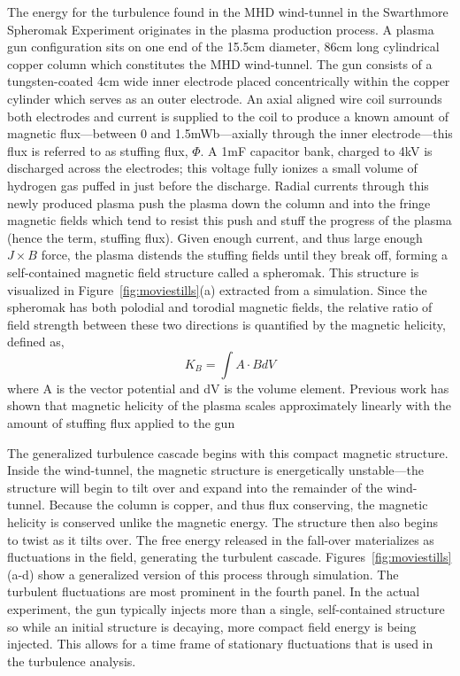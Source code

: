 \documentclass[aip,prl,amsmath,amssymb,reprint,superscriptaddress]{revtex4-1} %
\begin{document}
The energy for the turbulence found in the MHD wind-tunnel in the Swarthmore Spheromak Experiment originates in the plasma production process. A plasma gun configuration sits on one end of the 15.5cm diameter, 86cm long cylindrical copper column which constitutes the MHD wind-tunnel. The gun consists of a tungsten-coated 4cm wide inner electrode placed concentrically within the copper cylinder which serves as an outer electrode. An axial aligned wire coil surrounds both electrodes and current is supplied to the coil to produce a known amount of magnetic flux---between 0 and 1.5mWb---axially through the inner electrode---this flux is referred to as stuffing flux, $\Phi$. A 1mF capacitor bank, charged to 4kV is discharged across the electrodes; this voltage fully ionizes a small volume of hydrogen gas puffed in just before the discharge. Radial currents through this newly produced plasma push the plasma down the column and into the fringe magnetic fields which tend to resist this push and stuff the progress of the plasma (hence the term, stuffing flux). Given enough current, and thus large enough $J\times B$ force, the plasma distends the stuffing fields until they break off, forming a self-contained magnetic field structure called a spheromak. This structure is visualized in Figure~\ref{fig:moviestills}(a) extracted from a simulation. Since the spheromak has both polodial and torodial magnetic fields, the relative ratio of field strength between these two directions is quantified by the magnetic helicity, defined as,
\begin{equation}
K_{B} = \int A \cdot B dV
\label{eq:helicity_th}
\end{equation}
where A is the vector potential and dV is the volume element. Previous work has shown that magnetic helicity of the plasma scales approximately linearly with the amount of stuffing flux applied to the gun~\cite{schaffner14b}

The generalized turbulence cascade begins with this compact magnetic structure. Inside the wind-tunnel, the magnetic structure is energetically unstable---the structure will begin to tilt over and expand into the remainder of the wind-tunnel. Because the column is copper, and thus flux conserving, the magnetic helicity is conserved unlike the magnetic energy. The structure then also begins to twist as it tilts over. The free energy released in the fall-over materializes as fluctuations in the field, generating the turbulent cascade. Figures~\ref{fig:moviestills}(a-d) show a generalized version of this process through simulation. The turbulent fluctuations are most prominent in the fourth panel. In the actual experiment, the gun typically injects more than a single, self-contained structure so while an initial structure is decaying, more compact field energy is being injected. This allows for a time frame of stationary fluctuations that is used in the turbulence analysis.
\end{document}
